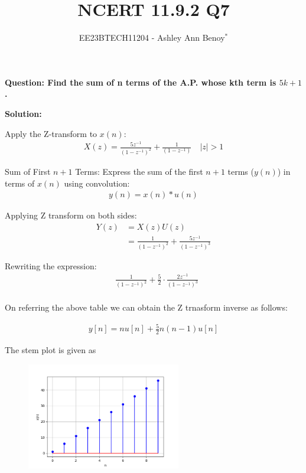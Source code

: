 \documentclass[journal,12pt,twocolumn]{IEEEtran}
\theoremstyle{remark}
\begin{document}

\vspace{3cm}

\title{NCERT 11.9.2  Q7}
\author{EE23BTECH11204 - Ashley Ann Benoy$^{*}$}%
\maketitle
\newpage
\bigskip

\renewcommand{\thefigure}{\theenumi}
\renewcommand{\thetable}{\theenumi}



\textbf{Question: Find the sum of n terms of the A.P. whose kth term is \(5k + 1\).}

\textbf{Solution:}


Apply the Z-transform to \( x(n) \):
\begin{align}
X(z) = \frac{5z^{-1}}{(1 - z^{-1})^2} + \frac{1}{(1 - z^{-1})}
\quad |z|>1
\end{align}

Sum of First \( n+1 \) Terms:
Express the sum of the first \( n+1 \) terms (\( y(n) \)) in terms of \( x(n) \) using convolution:
\begin{align}
y(n) = x(n) * u(n)
\end{align}

Applying Z transform on both sides:
\begin{align}
    Y(z) &= X(z)U(z)\\
    &=\frac{1}{(1-z^{-1})^2} + \frac{5z^{-1}}{(1-z^{-1})^3}
\end{align}





Rewriting the expression:
\begin{align}
&\frac{1}{(1 - z^{-1})^2} + \frac{5}{2} \cdot \frac{2z^{-1}}{(1 - z^{-1})^3} 
\end{align}
\\
On referring the above table we can obtain the  Z trnasform inverse as follows:

\begin{align}
y[n] = n u[n] + \frac{5}{2} n(n-1) u[n]
\end{align}

The stem plot is given as
\begin{figure}[h]
  \centering
  \includegraphics[width=0.6\textwidth]{figs/stem.png}
  \label{fig:Stem_Plot}
\end{figure}
\end{document}
